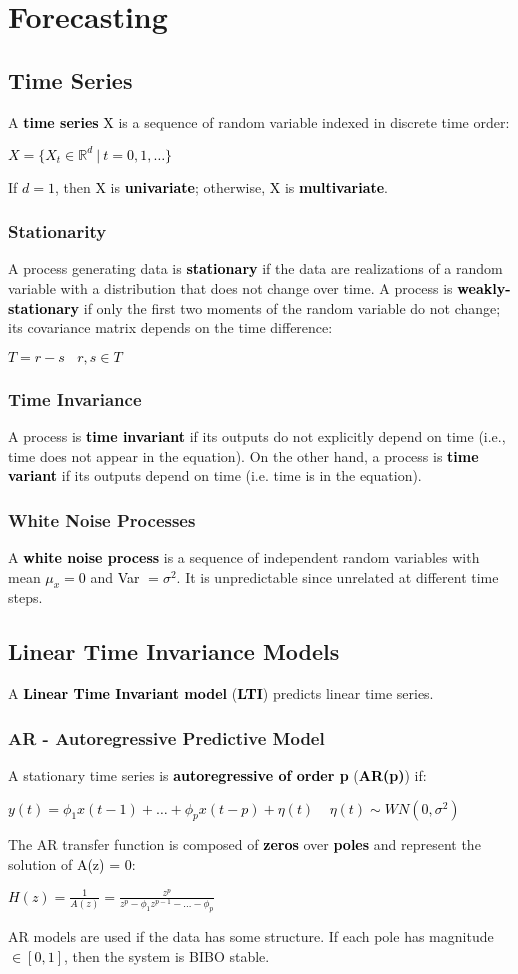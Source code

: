 \documentclass{article}
\newcommand{\bb}[1]{\textcolor{black}{\textbf{#1}}}
\newcommand{\rr}[1]{\textcolor{black}{#1}}
\newcommand{\cc}[1]{\begin{center}\textcolor{black}{#1}\end{center}}
\begin{document}
\newpage

\section{Forecasting}
\subsection{Time Series}
A \bb{time series} \rr{X} is a sequence of random variable indexed in discrete time order:
\cc{$X = \{X_t \in \mathbb{R}^d \ | \ t = 0,1,\dots\}$}
If \rr{$d=1$}, then \rr{X} is \bb{univariate}; otherwise, \rr{X} is \bb{multivariate}.
\subsubsection{Stationarity}
A process generating data is \bb{stationary} if the data are realizations of a random variable with a distribution that does not change over time. A process is \bb{weakly-stationary} if only the first two moments of the random variable do not change; its covariance matrix depends on the time difference:
\cc{$T=r-s \ \ \ \ r,s \in T$}
\subsubsection{Time Invariance}
A process is \bb{time invariant} if its outputs do not explicitly depend on time (i.e., time does not appear in the equation). On the other hand, a process is \bb{time variant} if its outputs depend on time (i.e. time is in the equation).
\subsubsection{White Noise Processes}
A \bb{white noise process} is a sequence of independent random variables with mean \rr{$\mu_x = 0$} and \rr{Var $= \sigma^2$}. It is unpredictable since unrelated at different time steps.

\subsection{Linear Time Invariance Models}
A \bb{Linear Time Invariant model} (\bb{LTI}) predicts linear time series.
\subsubsection{AR - Autoregressive Predictive Model}
A stationary time series is \bb{autoregressive of order p} (\bb{AR(p)}) if:
\cc{$y(t) = \phi_1x(t-1) + \dots + \phi_px(t-p) + \eta(t)\ \ \ \ \ \eta(t) \sim WN(0,\sigma^2)$}
The AR transfer function is composed of \bb{zeros} over \bb{poles} and represent the solution of \rr{A(z) = 0}:
\cc{$H(z) = \displaystyle\frac{1}{A(z)} =\displaystyle\frac{z^p}{z^p-\phi_1z^{p-1}- \dots-\phi_p}$}
AR models are used if the data has some structure. If each pole has magnitude \rr{$\in [0,1]$}, then the system is BIBO stable.
\end{document}

